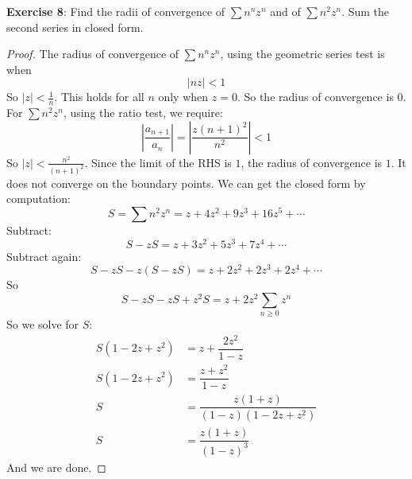 \documentclass{article}
\begin{document}
\textbf{Exercise 8}: Find the radii of convergence of $\sum n^{n}z^{n}$ and of $\sum n^{2}z^{n}$. Sum the second series in closed form.
    \begin{proof}
        The radius of convergence of $\sum n^{n}z^{n}$, using the geometric series test is when 
            \begin{equation*}
                \lvert nz \rvert < 1
            \end{equation*}
        So $\lvert z \rvert < \frac{1}{n}$. This holds for all $n$ only when $z = 0$. So the radius of convergence is $0$. For $\sum n^{2}z^{n}$, using the ratio test, we require:
            \begin{equation*}
                \left\lvert \dfrac{a_{n + 1}}{a_{n}} \right\rvert = \left\lvert \dfrac{z(n + 1)^{2}}{n^{2}} \right\rvert < 1
            \end{equation*}
        So $\lvert z \rvert < \frac{n^{2}}{(n + 1)^{2}}$. Since the limit of the RHS is $1$, the radius of convergence is $1$. It does not converge on the boundary points. We can get the closed form by computation:
            \begin{equation*}
                S = \sum n^{2}z^{n} = z + 4z^{2} + 9z^{3} + 16z^{5} + \cdots
            \end{equation*}
        Subtract:
            \begin{equation*}
                S - zS = z + 3z^{2} + 5z^{3} + 7z^{4} + \cdots
            \end{equation*}
        Subtract again:
            \begin{equation*}
                S - zS - z(S - zS) = z + 2z^{2} + 2z^{3} + 2z^{4} + \cdots
            \end{equation*}
        So
            \begin{equation*}
                S - zS - zS + z^{2}S = z + 2z^{2}\sum_{n \geq 0} z^{n}
            \end{equation*}
        So we solve for $S$:
            \begin{align*}
                S(1 - 2z + z^{2}) &= z + \dfrac{2z^{2}}{1 - z}                 \\
                S(1 - 2z + z^{2}) &= \dfrac{z + z^{2}}{1 - z}                  \\
                S                 &= \dfrac{z(1 + z)}{(1 - z)(1 - 2z + z^{2})} \\
                S                 &= \dfrac{z(1 + z)}{(1 - z)^{3}}               
            \end{align*}
        And we are done.
    \end{proof}
\end{document}
